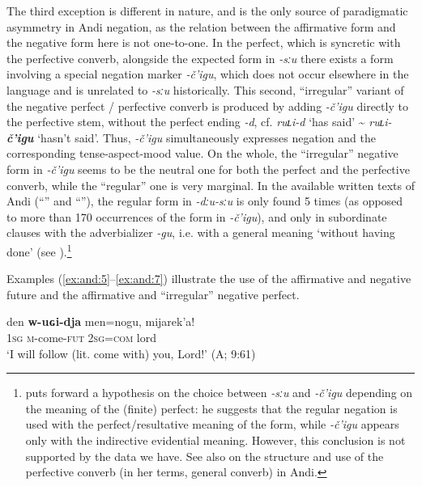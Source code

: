 \documentclass[output=paper,colorlinks=true, citecolor=brown]{langscibook}
\begin{document}
The third exception is different in nature, and is the only source of paradigmatic asymmetry in Andi negation, as the relation between the affirmative form and the negative form here is not one-to-one. In the perfect, which is syncretic with the perfective converb, alongside the expected form in \textit{{}-sːu} there exists a form involving a special negation marker \textit{\nobreakdash-č’igu}, which does not occur elsewhere in the language and is unrelated to \textit{{}-sːu} historically. This second, “irregular” variant of the negative perfect / perfective converb is produced by adding \textit{\nobreakdash-č’igu} directly to the perfective stem, without the perfect ending \textit{{}-d}, cf. \textit{ruʟi-d} ‘has said’ {\textasciitilde} \textit{ruʟi-}\textbf{\textit{č’igu}} ‘hasn’t said’. Thus, \textit{\nobreakdash-č’igu} simultaneously expresses negation and the corresponding tense-aspect-mood value. On the whole, the “irregular” negative form in \textit{\nobreakdash-č’igu} seems to be the neutral one for both the perfect and the perfective converb, while the “regular” one is very marginal. In the available written texts of Andi (“” and “”), the regular form in \textit{{}-dːu-sːu} is only found 5 times (as opposed to more than 170 occurrences of the form in \textit{\nobreakdash-č’igu}), and only in subordinate clauses with the adverbializer \textit{\nobreakdash-gu}, i.e. with a general meaning ‘without having done’ (see ).\footnote{\citet{Kibrik1985} puts forward a hypothesis on the choice between \textrm{\textit{{}-sːu}} and \textrm{\textit{\nobreakdash-č’igu}} depending on the meaning of the (finite) perfect: he suggests that the regular negation is used with the perfect/resultative meaning of the form, while \textrm{\textit{\nobreakdash-č’igu}} appears only with the indirective evidential meaning. However, this conclusion is not supported by the data we have. See also \citet[201--209]{Verhees2019} on the structure and use of the perfective converb (in her terms, general converb) in Andi.}

Examples (\ref{ex:and:5}–\ref{ex:and:7}) illustrate the use of the affirmative and negative future and the affirmative and “irregular” negative perfect.

\ea
    \label{ex:and:5}
    \gll  den \textbf{w{}-uɢi{}-dja} men=nogu, mijarek’a!\\
          \textsc{1sg} \textsc{m}{}-come-\textsc{fut} \textsc{2sg}=\textsc{com} lord\\
    \glt ‘I will follow (lit. come with) you, Lord!’ (A;  9:61)
\z 
        
\end{document}
